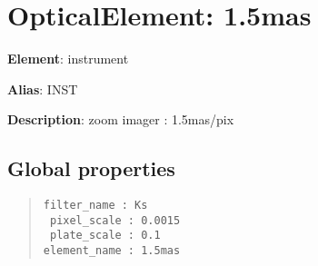 

\section{OpticalElement: \textquotedbl{}1.5mas\textquotedbl{}%
  \label{opticalelement-1-5mas}%
}

\textbf{Element}: instrument

\textbf{Alias}: INST

\textbf{Description}: zoom imager : 1.5mas/pix


\subsection{Global properties%
  \label{global-properties}%
}

\begin{quote}
\begin{alltt}
\begin{lstlisting}[frame=single]
 filter_name : Ks
 pixel_scale : 0.0015
 plate_scale : 0.1
element_name : 1.5mas
\end{lstlisting}
\end{alltt}
\end{quote}
